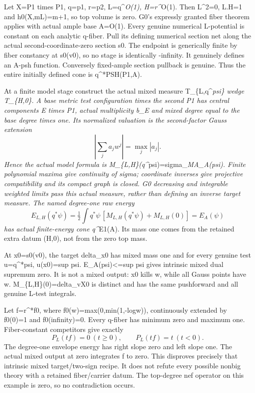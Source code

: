\documentclass[
  10pt,
]{article}
\begin{document}
Let X=P1 times P1, q=p1, r=p2, L=q\^{}\emph{O(1), H=r\^{}}O(1). Then
L\^{}2=0, L.H=1 and h0(X,mL)=m+1, so top volume is zero. G0's expressly
granted fiber theorem applies with actual ample base A=O(1). Every
genuine numerical L-potential is constant on each analytic q-fiber. Pull
its defining numerical section net along the actual
second-coordinate-zero section s0. The endpoint is generically finite by
fiber constancy at s0(v0), so no stage is identically -infinity. It
genuinely defines an A-psh function. Conversely fixed-ample section
pullback is genuine. Thus the entire initially defined cone is
q\^{}*PSH(P1,A).

At a finite model stage construct the actual mixed measure
T\_\{L,q\^{}\emph{psi\} wedge T\_\{H,0\}. A base metric test
configuration times the second P1 has central components E times P1,
actual multiplicity b\_E and mixed degree equal to the base degree times
one. Its normalized valuation is the second-factor Gauss extension \[
 \left|\sum_j a_jw^j\right|=\max_j|a_j|.
\] Hence the actual model formula is
M\_\{L,H\}(q\^{}}psi)=sigma\_\emph{MA\_A(psi). Finite polynomial maxima
give continuity of sigma; coordinate inverses give projective
compatibility and its compact graph is closed. G0 decreasing and
integrable weighted limits pass this actual measure, rather than
defining an inverse target measure. The named degree-one raw energy \[
 E_{L,H}(q^*\psi)=\tfrac12\int q^*\psi\,[M_{L,H}(q^*\psi)+M_{L,H}(0)]=E_A(\psi)
\] has actual finite-energy cone q\^{}}E1(A). Its mass one comes from
the retained extra datum (H,0), not from the zero top mass.

At x0=s0(v0), the target delta\_x0 has mixed mass one and for every
genuine test u=q\^{}*psi, u(x0)=sup psi. E\_A(psi)\textless=sup psi
gives intrinsic mixed dual supremum zero. It is not a mixed output: x0
kills w, while all Gauss points have \textbar w.
M\_\{L,H\}(0)=delta\_vX0 is distinct and has the same pushforward and
all genuine L-test integrals.

Let f=r\^{}*f0, where f0(w)=max(0,min(1,-log\textbar w\textbar)),
continuously extended by f0(0)=1 and f0(infinity)=0. Every q-fiber has
minimum zero and maximum one. Fiber-constant competitors give exactly \[
 P_L(tf)=0\ (t\ge0),\qquad P_L(tf)=t\ (t<0).
\] The degree-one envelope energy has right slope zero and left slope
one. The actual mixed output at zero integrates f to zero. This
disproves precisely that intrinsic mixed target/two-sign recipe. It does
not refute every possible nonbig theory with a retained fiber/carrier
datum. The top-degree nef operator on this example is zero, so no
contradiction occurs.
\end{document}
